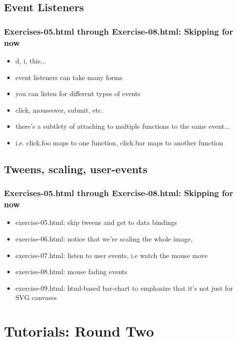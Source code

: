 \documentclass{beamer}
\begin{document}
\subsection{Event Listeners}

\begin{frame}
    \frametitle{Exercises-05.html through Exercise-08.html: Skipping for now}
    \begin{itemize}
    \item d, i, this...
    \item event listeners can take many forms
    \item you can listen for different types of events
    \item click, mouseover, submit, etc.
    \item there's a subtlety of attaching to multiple functions to the same event...
    \item i.e. click.foo maps to one function, click.bar maps to another function
    \end{itemize}
\end{frame}



\subsection{Tweens, scaling, user-events}

\begin{frame}
    \frametitle{Exercises-05.html through Exercise-08.html: Skipping for now}
    \begin{itemize}
    \item exercise-05.html: skip tweens and get to data bindings
    \item exercise-06.html: notice that we're scaling the whole image,
    \item exercise-07.html: listen to user events, i.e watch the mouse move
    \item exercise-08.html: mouse fading events
    \item exercise-09.html: html-based bar-chart to emphasize that it's not just for SVG canvases
    \end{itemize}
\end{frame}



\section{Tutorials: Round Two}
\end{document}
